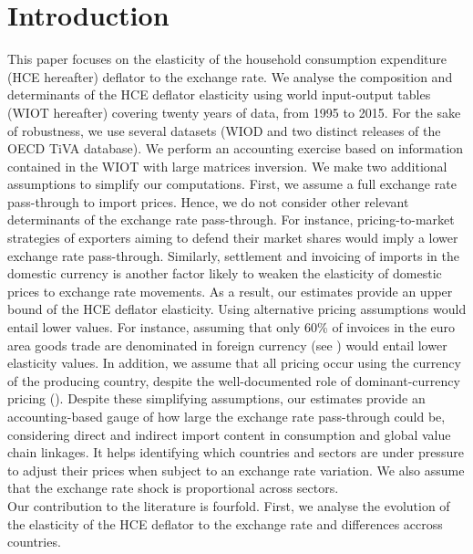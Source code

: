 \documentclass[12pt,a4paper]{paper}
\begin{document}
\section*{Introduction}
This paper focuses on the elasticity of the household consumption expenditure (HCE hereafter) deflator to the exchange rate. 
We analyse the composition and determinants of the HCE deflator elasticity using world input-output tables (WIOT hereafter) covering twenty years of data, from 1995 to 2015.
For the sake of robustness, we use several datasets (WIOD and two distinct releases of the OECD TiVA database). 
We perform an accounting exercise based on information contained in the WIOT with large matrices inversion. 
We make two additional assumptions to simplify our computations. 
First, we assume a full exchange rate pass-through to import prices. 
Hence, we do not consider other relevant determinants of the exchange rate pass-through.
For instance, pricing-to-market strategies of exporters aiming to defend their market shares would imply a lower exchange rate pass-through.
Similarly, settlement and invoicing of imports in the domestic currency is another factor likely to weaken the elasticity of domestic prices to exchange rate movements.
As a result, our estimates provide an upper bound of the HCE deflator elasticity.
Using alternative pricing assumptions would entail lower values.
For instance, assuming that only 60\% of invoices in the euro area goods trade are denominated in foreign currency (see \cite{Ortega2020}) would entail lower elasticity values. 
In addition, we assume that all pricing occur using the currency of the producing country, despite the well-documented role of dominant-currency pricing (\cite{Gopinath2020}).
Despite these simplifying assumptions, our estimates provide an accounting-based gauge of how large the exchange rate pass-through could be, considering direct and indirect import content in consumption and global value chain linkages. 
It helps identifying which countries and sectors are under pressure to adjust their prices when subject to an exchange rate variation. 
We also assume that the exchange rate shock is proportional across sectors. \\
Our contribution to the literature is fourfold. 
First, we analyse the evolution of the elasticity of the HCE deflator to the exchange rate and differences accross countries.
\end{document}
